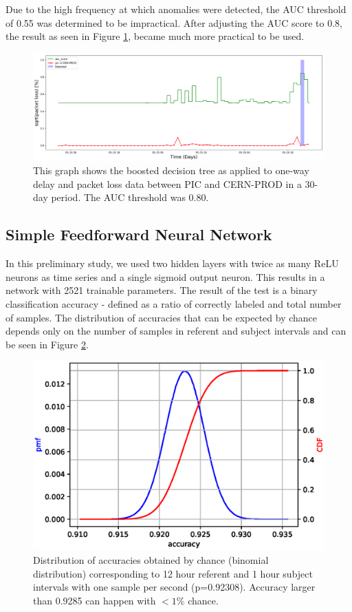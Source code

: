 \documentclass[5p]{elsarticle}
\begin{document}
Due to the high frequency at which anomalies were detected, the AUC threshold of 0.55 was determined to be impractical. After adjusting the AUC score to 0.8, the result as seen in Figure \ref{fig:BDThigh}, became much more practical to be used. 
\begin{figure}[htbp]
    \centering
    \includegraphics[width=\linewidth]{BDT_highcut.png}
    \caption{This graph shows the boosted decision tree as applied to one-way delay and packet loss data between PIC and CERN-PROD in a 30-day period. The AUC threshold was 0.80.}
    \label{fig:BDThigh}
\end{figure}


\subsection{Simple Feedforward Neural Network}

In this preliminary study, we used two hidden layers with twice as many ReLU neurons as time series and a single sigmoid output neuron. This results in a network with 2521 trainable parameters.
The result of the test is a binary classification accuracy - defined as a ratio of correctly labeled and total number of samples. The distribution of accuracies that can be expected by chance depends only on the number of samples in referent and subject intervals and can be seen in Figure \ref{fig:Chance}.


\begin{figure}[htbp]
    \centering
    \includegraphics[width=\linewidth]{binomial_chance_accuracy.eps}
    \caption{Distribution of accuracies obtained by chance (binomial distribution) corresponding to 12 hour referent and 1 hour subject intervals with one sample per second (p=0.92308). Accuracy larger than 0.9285 can happen with $<1\%$ chance. }
    \label{fig:Chance}
\end{figure}
\end{document}
